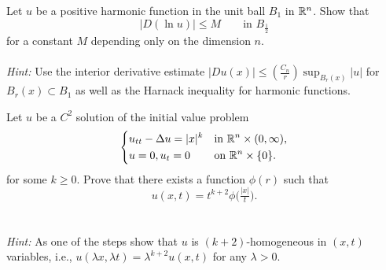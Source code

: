 \begin{problem}
  Let \(u\) be a positive harmonic function in the unit ball \(B_1\) in
  \(\mathbb{R}^n\). Show that
  \[
    \bigl|D(\ln u)\bigr|\leq M\qquad \text{in \(B_{\frac{1}{2}}\)}
  \]
  for a constant \(M\) depending only on the dimension \(n\).
  \\\\
  \emph{Hint:} Use the interior derivative estimate
  \(\bigl|Du(x)\bigr|\leq(\frac{C_n}{r})\sup_{B_r(x)}|u|\) for
  \(B_r(x)\subset B_1\) as well as the Harnack inequality for harmonic
  functions.
\end{problem}
\begin{solution*}
\end{solution*}

\begin{problem}
  Let \(u\) be a \(C^2\) solution of the initial value problem
  \[
    \left\{
    \begin{aligned}
      &u_{tt}-\Delta u=|x|^k&&\text{in \(\mathbb{R}^n\times(0,\infty)\),}\\
      &u=0,u_t=0&&\text{on \(\mathbb{R}^n\times\{0\}\)}.
    \end{aligned}
    \right.
  \]
  for some \(k\geq 0\). Prove that there exists a function \(\phi(r)\)
  such that
  \[
    u(x,t)=t^{k+2}\phi\bigl(\tfrac{|x|}{t}\bigr).
  \]
  \\\\
  \emph{Hint:} As one of the steps show that \(u\) is \((k+2)\)-homogeneous
  in \((x,t)\) variables, i.e.,
  \(u(\lambda x,\lambda t)=\lambda^{k+2}u(x,t)\) for any \(\lambda >0\).
\end{problem}
\begin{solution*}
\end{solution*}

